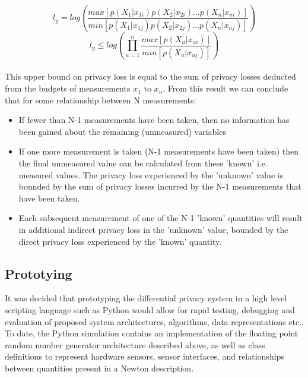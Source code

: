 \documentclass[pageno]{jpaper}
\begin{document}
\begin{equation} \label{eqn:ub_l_y_expanded}
  l_y = log\left( \frac{max[p(X_1 | x_{1i})p(X_2 | x_{2i})...p(X_n | x_{ni})]}{min[p(X_1 | x_{1j})p(X_2 | x_{2j})...p(X_n | x_{nj})]} \right) \nonumber
\end{equation}
\begin{equation} \label{eqn:ub_l_y_unconstrained}
  l_y \leq log\left( \prod_{u=1}^n \frac{max[p(X_u|x_{ui})]}{min[p(X_u|x_{uj})]} \right)
\end{equation}
\\
This upper bound on privacy loss is equal to the sum of privacy losses deducted from the budgets of measurements $x_1$ to $x_n$. From this result we can conclude  that for some relationship between N measurements:
\begin{itemize}
  \item If fewer than N-1 measurements have been taken, then no information has been gained about the remaining (unmeasured) variables
  \item If one more measurement is taken (N-1 measurements have been taken) then the final unmeasured value can be calculated from these 'known' i.e. measured values. The privacy loss experienced by the 'unknown' value is bounded by the sum of privacy losses incurred by the N-1 measurements that have been taken.
  \item Each subsequent measurement of one of the N-1 'known' quantities will result in additional indirect privacy loss in the 'unknown' value, bounded by the direct privacy loss experienced by the 'known' quantity.
\end{itemize}

\subsection{Prototying}
It was decided that prototyping the differential privacy system in a high level scripting language such as Python would allow for rapid testing, debugging and evaluation of proposed system architectures, algorithms, data representations etc.. To date, the Python simulation contains an implementation of the floating point random number generator architecture described above\cite{DeSchryver}, as well as class definitions to represent hardware sensors, sensor interfaces, and relationships between quantities present in a Newton description.
\end{document}
